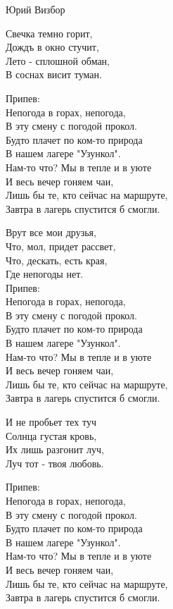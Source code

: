 {Юрий Визбор}
\begin{text}
Свечка темно горит,\\
Дождъ в окно стучит,\\
Лето - сплошной обман,\\
В соснах висит туман.

Припев:\\
Непогода в горах, непогода,\\
В эту смену с погодой прокол.\\
Будто плачет по ком-то природа\\
В нашем лагере "Узункол".\\
Нам-то что? Мы в тепле и в уюте\\
И весь вечер гоняем чаи,\\
Лишь бы те, кто сейчас на маршруте,\\
Завтра в лагерь спустится б смогли.

Врут все мои друзья,\\
Что, мол, придет рассвет,\\
Что, дескать, есть края,\\
Где непогоды нет.\\

Припев:\\
Непогода в горах, непогода,\\
В эту смену с погодой прокол.\\
Будто плачет по ком-то природа\\
В нашем лагере "Узункол".\\
Нам-то что? Мы в тепле и в уюте\\
И весь вечер гоняем чаи,\\
Лишь бы те, кто сейчас на маршруте,\\
Завтра в лагерь спустится б смогли.

И не пробьет тех туч\\
Солнца густая кровь,\\
Их лишь разгонит луч,\\
Луч тот - твоя любовь.

Припев:\\
Непогода в горах, непогода,\\
В эту смену с погодой прокол.\\
Будто плачет по ком-то природа\\
В нашем лагере "Узункол".\\
Нам-то что? Мы в тепле и в уюте\\
И весь вечер гоняем чаи,\\
Лишь бы те, кто сейчас на маршруте,\\
Завтра в лагерь спустится б смогли.
\end{text}

